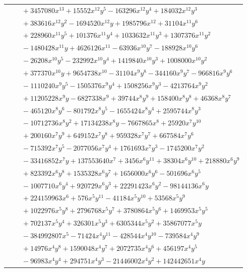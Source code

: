 \documentclass[11pt]{article}
\begin{document}
\begin{longtable}{@{}ll@{}}
 & $\quad +3457080x^{13}+15552x^{12}y^{5}-163296x^{12}y^{4}+184032x^{12}y^{3}$\\
 & $\quad +383616x^{12}y^{2}-1694520x^{12}y+1985796x^{12}+31104x^{11}y^{6}$\\
 & $\quad +228960x^{11}y^{5}+101376x^{11}y^{4}+1033632x^{11}y^{3}+1307376x^{11}y^{2}$\\
 & $\quad -1480428x^{11}y+4626126x^{11}-63936x^{10}y^{7}-188928x^{10}y^{6}$\\
 & $\quad -26208x^{10}y^{5}-232992x^{10}y^{4}+1419840x^{10}y^{3}+1008000x^{10}y^{2}$\\
 & $\quad +377370x^{10}y+9654738x^{10}-31104x^{9}y^{8}-344160x^{9}y^{7}-966816x^{9}y^{6}$\\
 & $\quad -1110240x^{9}y^{5}-1505376x^{9}y^{4}+1508256x^{9}y^{3}-4213764x^{9}y^{2}$\\
 & $\quad +11205228x^{9}y-6827338x^{9}+39744x^{8}y^{9}+158400x^{8}y^{8}+46368x^{8}y^{7}$\\
 & $\quad -465120x^{8}y^{6}-801792x^{8}y^{5}-1655424x^{8}y^{4}+2595744x^{8}y^{3}$\\
 & $\quad -10712736x^{8}y^{2}+17134238x^{8}y-7667865x^{8}+25920x^{7}y^{10}$\\
 & $\quad +200160x^{7}y^{9}+649152x^{7}y^{8}+959328x^{7}y^{7}+667584x^{7}y^{6}$\\
 & $\quad -715392x^{7}y^{5}-2077056x^{7}y^{4}+1761693x^{7}y^{3}-1745200x^{7}y^{2}$\\
 & $\quad -33416852x^{7}y+137553640x^{7}+3456x^{6}y^{11}+38304x^{6}y^{10}+218880x^{6}y^{9}$\\
 & $\quad +823392x^{6}y^{8}+1535328x^{6}y^{7}+1656000x^{6}y^{6}-501696x^{6}y^{5}$\\
 & $\quad -1007710x^{6}y^{4}+920729x^{6}y^{3}+22291423x^{6}y^{2}-98144136x^{6}y$\\
 & $\quad +224159963x^{6}+576x^{5}y^{11}-41184x^{5}y^{10}+53568x^{5}y^{9}$\\
 & $\quad +1022976x^{5}y^{8}+2796768x^{5}y^{7}+3780864x^{5}y^{6}+1469953x^{5}y^{5}$\\
 & $\quad +702137x^{5}y^{4}+326301x^{5}y^{3}+6305344x^{5}y^{2}+35867077x^{5}y$\\
 & $\quad -384992807x^{5}-71424x^{4}y^{11}-428544x^{4}y^{10}-739584x^{4}y^{9}$\\
 & $\quad +14976x^{4}y^{8}+1590048x^{4}y^{7}+2072735x^{4}y^{6}+456197x^{4}y^{5}$\\
 & $\quad -96983x^{4}y^{4}+294751x^{4}y^{3}-21446002x^{4}y^{2}+142442651x^{4}y$\\

\end{longtable}
\end{document}
